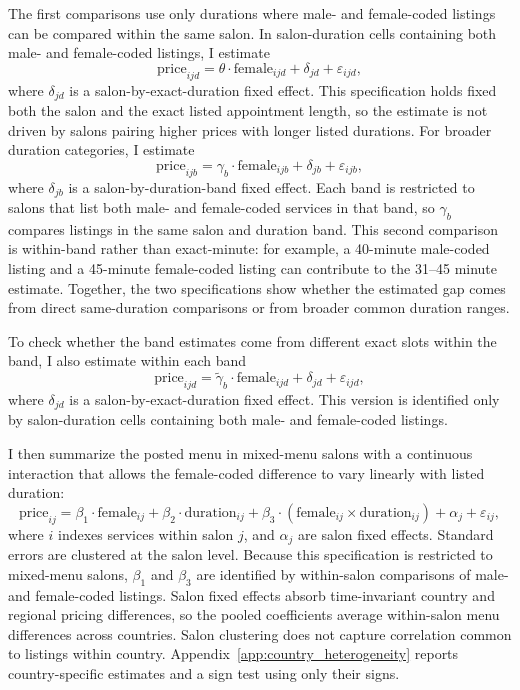 \documentclass[12pt,a4paper]{article}
\begin{document}
The first comparisons use only durations where male- and female-coded listings can be compared within the same salon. In salon-duration cells containing both male- and female-coded listings, I estimate
\[
\text{price}_{ijd} = \theta \cdot \text{female}_{ijd} + \delta_{jd} + \varepsilon_{ijd},
\]
where $\delta_{jd}$ is a salon-by-exact-duration fixed effect. This specification holds fixed both the salon and the exact listed appointment length, so the estimate is not driven by salons pairing higher prices with longer listed durations. For broader duration categories, I estimate
\[
\text{price}_{ijb} = \gamma_b \cdot \text{female}_{ijb} + \delta_{jb} + \varepsilon_{ijb},
\]
where $\delta_{jb}$ is a salon-by-duration-band fixed effect. Each band is restricted to salons that list both male- and female-coded services in that band, so $\gamma_b$ compares listings in the same salon and duration band. This second comparison is within-band rather than exact-minute: for example, a 40-minute male-coded listing and a 45-minute female-coded listing can contribute to the 31--45 minute estimate. Together, the two specifications show whether the estimated gap comes from direct same-duration comparisons or from broader common duration ranges.

To check whether the band estimates come from different exact slots within the band, I also estimate within each band
\[
\text{price}_{ijd} = \tilde{\gamma}_b \cdot \text{female}_{ijd} + \delta_{jd} + \varepsilon_{ijd},
\]
where $\delta_{jd}$ is a salon-by-exact-duration fixed effect. This version is identified only by salon-duration cells containing both male- and female-coded listings.

I then summarize the posted menu in mixed-menu salons with a continuous interaction that allows the female-coded difference to vary linearly with listed duration:
\[
\text{price}_{ij} = \beta_1 \cdot \text{female}_{ij} + \beta_2 \cdot \text{duration}_{ij} + \beta_3 \cdot (\text{female}_{ij} \times \text{duration}_{ij}) + \alpha_j + \varepsilon_{ij},
\]
where $i$ indexes services within salon $j$, and $\alpha_j$ are salon fixed effects. Standard errors are clustered at the salon level. Because this specification is restricted to mixed-menu salons, $\beta_1$ and $\beta_3$ are identified by within-salon comparisons of male- and female-coded listings. Salon fixed effects absorb time-invariant country and regional pricing differences, so the pooled coefficients average within-salon menu differences across countries. Salon clustering does not capture correlation common to listings within country. Appendix~\ref{app:country_heterogeneity} reports country-specific estimates and a sign test using only their signs.
\end{document}
